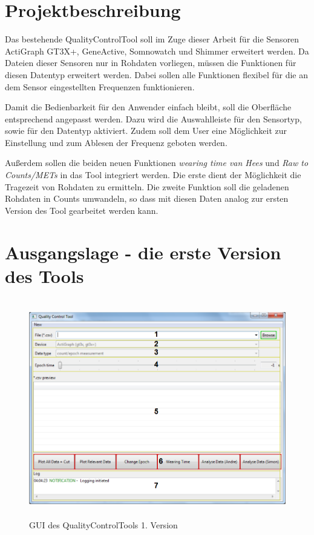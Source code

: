 \documentclass[onecolumn,german]{article}
\begin{document}
\section{Projektbeschreibung}

Das bestehende QualityControlTool soll im Zuge dieser Arbeit für die Sensoren ActiGraph GT3X+, GeneActive, Somnowatch und Shimmer erweitert werden. Da Dateien dieser Sensoren nur in Rohdaten vorliegen, müssen die Funktionen für diesen Datentyp erweitert werden. Dabei sollen alle Funktionen flexibel für die an dem Sensor eingestellten Frequenzen funktionieren.\newline

Damit die Bedienbarkeit für den Anwender einfach bleibt, soll die Oberfläche entsprechend angepasst werden. Dazu wird die Auswahlleiste für den Sensortyp, sowie für den Datentyp aktiviert. Zudem soll dem User eine Möglichkeit zur Einstellung und zum Ablesen der Frequenz geboten werden. \newline

Außerdem sollen die beiden neuen Funktionen \textit{wearing time van Hees} und \textit{Raw to Counts/METs} in das Tool integriert werden. Die erste dient der Möglichkeit die Tragezeit von Rohdaten zu ermitteln. Die zweite Funktion soll die geladenen Rohdaten in Counts umwandeln, so dass mit diesen Daten analog zur ersten Version des Tool gearbeitet werden kann.


\section{Ausgangslage - die erste Version des Tools}
\label{first}

\begin{figure}[H]
\centerline{
\includegraphics[width=150mm, height=95mm]{Abbildungen/version_1.png}
}
\caption {GUI des QualityControlTools 1. Version}
\label{v1}
\end{figure}
\end{document}
